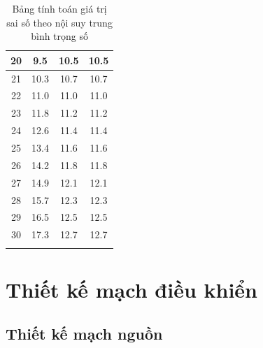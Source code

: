 \begin{longtable}{|c|c|c|c|}
                20 & 9.5 & 10.5 & 10.5 \\
                \hline
                21 & 10.3 & 10.7 & 10.7 \\
                \hline
                22 & 11.0 & 11.0 & 11.0 \\
                \hline
                23 & 11.8 & 11.2 & 11.2 \\
                \hline
                24 & 12.6 & 11.4 & 11.4 \\
                \hline
                25 & 13.4 & 11.6 & 11.6 \\
                \hline
                26 & 14.2 & 11.8 & 11.8 \\
                \hline
                27 & 14.9 & 12.1 & 12.1 \\
                \hline
                28 & 15.7 & 12.3 & 12.3 \\
                \hline
                29 & 16.5 & 12.5 & 12.5 \\
                \hline
                30 & 17.3 & 12.7 & 12.7 \\
                \hline
                \caption{Bảng tính toán giá trị sai số theo nội suy trung bình trọng số}
                \label{tab:4-4}
            \end{longtable}
    \section{Thiết kế mạch điều khiển} 
        \subsection{Thiết kế mạch nguồn}
